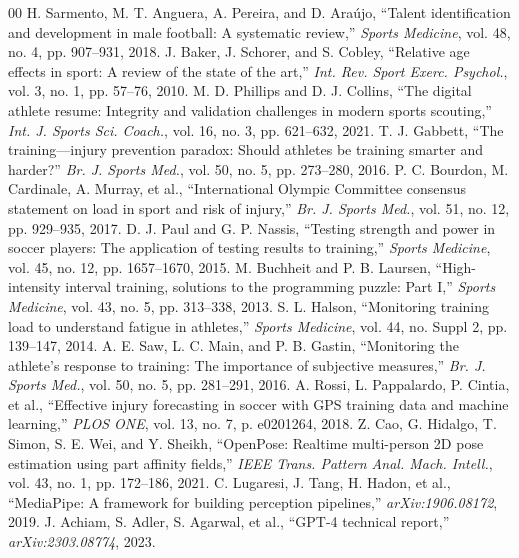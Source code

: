 \documentclass[conference]{IEEEtran}
\begin{document}
\begin{thebibliography}{00}
 H. Sarmento, M. T. Anguera, A. Pereira, and D. Ara{\'u}jo, ``Talent identification and development in male football: A systematic review,'' \textit{Sports Medicine}, vol. 48, no. 4, pp. 907--931, 2018.
 J. Baker, J. Schorer, and S. Cobley, ``Relative age effects in sport: A review of the state of the art,'' \textit{Int. Rev. Sport Exerc. Psychol.}, vol. 3, no. 1, pp. 57--76, 2010.
 M. D. Phillips and D. J. Collins, ``The digital athlete resume: Integrity and validation challenges in modern sports scouting,'' \textit{Int. J. Sports Sci. Coach.}, vol. 16, no. 3, pp. 621--632, 2021.
 T. J. Gabbett, ``The training---injury prevention paradox: Should athletes be training smarter and harder?'' \textit{Br. J. Sports Med.}, vol. 50, no. 5, pp. 273--280, 2016.
 P. C. Bourdon, M. Cardinale, A. Murray, et al., ``International Olympic Committee consensus statement on load in sport and risk of injury,'' \textit{Br. J. Sports Med.}, vol. 51, no. 12, pp. 929--935, 2017.
 D. J. Paul and G. P. Nassis, ``Testing strength and power in soccer players: The application of testing results to training,'' \textit{Sports Medicine}, vol. 45, no. 12, pp. 1657--1670, 2015.
 M. Buchheit and P. B. Laursen, ``High-intensity interval training, solutions to the programming puzzle: Part I,'' \textit{Sports Medicine}, vol. 43, no. 5, pp. 313--338, 2013.
 S. L. Halson, ``Monitoring training load to understand fatigue in athletes,'' \textit{Sports Medicine}, vol. 44, no. Suppl 2, pp. 139--147, 2014.
 A. E. Saw, L. C. Main, and P. B. Gastin, ``Monitoring the athlete's response to training: The importance of subjective measures,'' \textit{Br. J. Sports Med.}, vol. 50, no. 5, pp. 281--291, 2016.
 A. Rossi, L. Pappalardo, P. Cintia, et al., ``Effective injury forecasting in soccer with GPS training data and machine learning,'' \textit{PLOS ONE}, vol. 13, no. 7, p. e0201264, 2018.
 Z. Cao, G. Hidalgo, T. Simon, S. E. Wei, and Y. Sheikh, ``OpenPose: Realtime multi-person 2D pose estimation using part affinity fields,'' \textit{IEEE Trans. Pattern Anal. Mach. Intell.}, vol. 43, no. 1, pp. 172--186, 2021.
 C. Lugaresi, J. Tang, H. Hadon, et al., ``MediaPipe: A framework for building perception pipelines,'' \textit{arXiv:1906.08172}, 2019.
 J. Achiam, S. Adler, S. Agarwal, et al., ``GPT-4 technical report,'' \textit{arXiv:2303.08774}, 2023.

\end{thebibliography}
\end{document}
